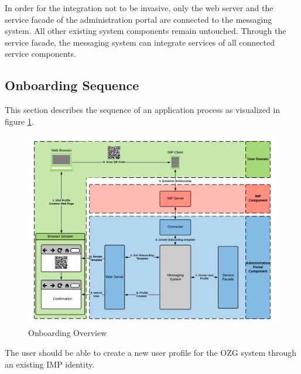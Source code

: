 In order for the integration not to be invasive, only the web server and the service facade of the administration portal are connected to the messaging system. All other existing system components remain untouched. Through the service facade, the messaging system can integrate services of all connected service components.

\subsection{Onboarding Sequence}
This section describes the sequence of an application process as visualized in figure \ref{integration1:onboarding_overview}.

\begin{figure}[h]
    \centering
    \includegraphics[scale=0.6]{Diagrams/Integration Architecture 1/Technological Integration/5. Onboarding Overview.pdf}
    \caption{Onboarding Overview}
    \label{integration1:onboarding_overview}
\end{figure}

The user should be able to create a new user profile for the OZG system through an existing IMP identity. 

